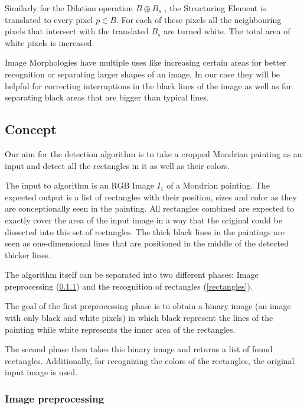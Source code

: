 Similarly for the Dilation operation  $B \oplus B_s$ , the Structuring Element
is translated to every pixel $p \in B$. For each of these pixels all the
neighbouring pixels that intersect with the translated $B_s$ are turned white.
The total area of white pixels is increased. \cite{Smith1997}

Image Morphologies have multiple uses like increasing certain areas for better
recognition or separating larger shapes of an image. In our case they will be
helpful for correcting interruptions in the black lines of the image as well as
for separating black areas that are bigger than typical lines.


\subsection{Concept}


Our aim for the detection algorithm is to take a cropped Mondrian painting as
an input and detect all the rectangles in it as well as their colors.

The input to algorithm is an RGB Image $I_1$ of a Mondrian painting. The
expected output is a list of rectangles with their position, sizes and color as
they are conceptionally seen in the painting. All rectangles combined are
expected to exactly cover the area of the input image in a way that the original
could be dissected into this set of rectangles. The thick black lines in the
paintings are seen as one-dimensional lines that are positioned in the middle
of the detected thicker lines.

The algorithm itself can be separated into two different phases: Image
preprocessing (\ref{preprocessing}) and the recognition of rectangles (\ref{rectangles}).

The goal of the first preprocessing phase is to obtain a binary image (an image
with only black and white pixels) in which black represent the lines of the
painting while white represents the inner area of the rectangles.

The second phase then takes this binary image and returns a list of found
rectangles. Additionally, for recognizing the colors of the rectangles, the
original input image is used.

\subsubsection{Image preprocessing} \label{preprocessing}

